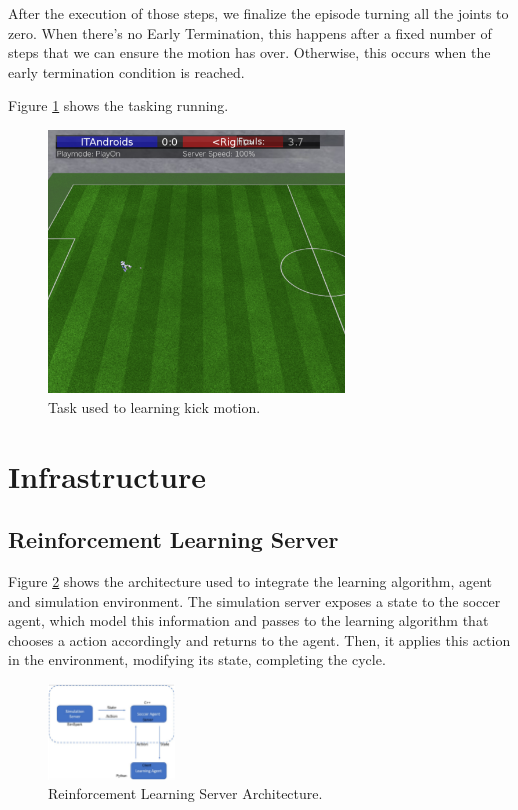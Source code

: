 After the execution of those steps, we finalize the episode turning all the joints to zero. When there's no Early Termination, this happens after a fixed number of steps that we can ensure the motion has over. Otherwise, this occurs when the early termination condition is reached.

Figure \ref{taskdescription} shows the tasking running.


\begin{figure}[!htbp]
	\centering
	\includegraphics[width=0.7\textwidth]{Cap5/taskdescription.eps}
	\caption{Task used to learning kick motion.}
	\label{taskdescription}
\end{figure}

\section{Infrastructure}
\subsection{Reinforcement Learning Server}\label{rlarchitecture}

Figure \ref{rlserver} shows the architecture used to integrate the learning algorithm, agent and simulation environment. The simulation server exposes a state to the soccer agent, which model this information and passes to the learning algorithm that chooses a action accordingly and returns to the agent. Then, it applies this action in the environment, modifying its state, completing the cycle.

\begin{figure}[!htbp]
	\centering
	\includegraphics[width=0.3\textwidth]{Cap5/rlserver.eps}
	\caption{Reinforcement Learning Server Architecture.
		\cite{tgmuzio}
	}
	\label{rlserver}
\end{figure}

